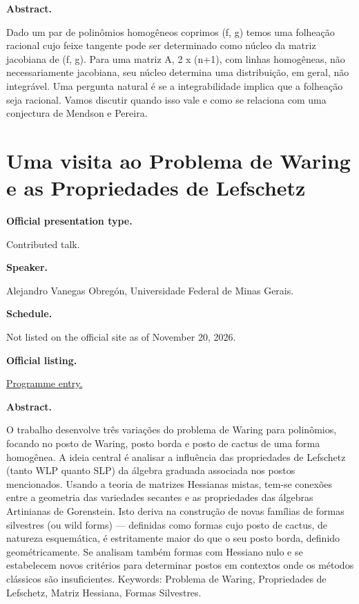 \medskip\noindent
{\bf Abstract.}

Dado um par de polinômios homogêneos coprimos
(f, g) temos uma folheação racional cujo
feixe tangente pode ser determinado como
núcleo da matriz jacobiana de (f, g). Para
uma matriz A, 2 x (n+1), com linhas
homogêneas, não necessariamente jacobiana,
seu núcleo determina uma distribuição, em
geral, não integrável. Uma pergunta natural é
se a integrabilidade implica que a folheação
seja racional. Vamos discutir quando isso
vale e como se relaciona com uma conjectura
de Mendson e Pereira.

\section{Uma visita ao Problema de Waring e
as Propriedades de Lefschetz}
\label{section-uma-visita-ao-problema-de}

\medskip\noindent
{\bf Official presentation type.}

Contributed talk.

\medskip\noindent
{\bf Speaker.}

Alejandro Vanegas Obregón, Universidade
Federal de Minas Gerais.

\medskip\noindent
{\bf Schedule.}

Not listed on the official site as of
November 20, 2026.

\medskip\noindent
{\bf Official listing.}

\href{%
https://sites.google.com/view/%
geoalgcompluff/legal/%
legal-2027-resumos#h.dant8g3oe5ea%
}{Programme entry.}

\medskip\noindent
{\bf Abstract.}

O trabalho desenvolve três variações do
problema de Waring para polinômios, focando
no posto de Waring, posto borda e posto de
cactus de uma forma homogênea. A ideia
central é analisar a influência das
propriedades de Lefschetz (tanto WLP quanto
SLP) da álgebra graduada associada nos postos
mencionados. Usando a teoria de matrizes
Hessianas mistas, tem-se conexões entre a
geometria das variedades secantes e as
propriedades das álgebras Artinianas de
Gorenstein. Isto deriva na construção de
novas famílias de formas silvestres (ou wild
forms) — definidas como formas cujo posto de
cactus, de natureza esquemática, é
estritamente maior do que o seu posto borda,
definido geométricamente. Se analisam também
formas com Hessiano nulo e se estabelecem
novos critérios para determinar postos em
contextos onde os métodos clássicos são
insuficientes. Keywords: Problema de Waring,
Propriedades de Lefschetz, Matriz Hessiana,
Formas Silvestres.

